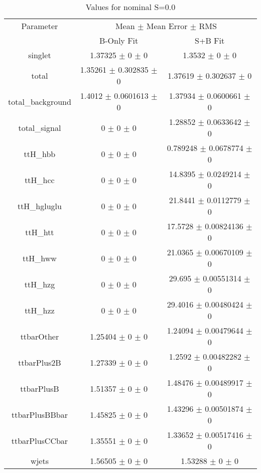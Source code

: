 \begin{table}
\centering
\caption{Values for nominal S=0.0}
\begin{tabular}{ccc}
\toprule
Parameter & \multicolumn{2}{c}{Mean $\pm$ Mean Error $\pm$ RMS}\\
 & B-Only Fit & S+B Fit\\
\midrule
singlet & \num{1.37325} $\pm$ \num{0} $\pm$ \num{0} & \num{1.3532} $\pm$ \num{0} $\pm$ \num{0}\\
total & \num{1.35261} $\pm$ \num{0.302835} $\pm$ \num{0} & \num{1.37619} $\pm$ \num{0.302637} $\pm$ \num{0}\\
total\_background & \num{1.4012} $\pm$ \num{0.0601613} $\pm$ \num{0} & \num{1.37934} $\pm$ \num{0.0600661} $\pm$ \num{0}\\
total\_signal & \num{0} $\pm$ \num{0} $\pm$ \num{0} & \num{1.28852} $\pm$ \num{0.0633642} $\pm$ \num{0}\\
ttH\_hbb & \num{0} $\pm$ \num{0} $\pm$ \num{0} & \num{0.789248} $\pm$ \num{0.0678774} $\pm$ \num{0}\\
ttH\_hcc & \num{0} $\pm$ \num{0} $\pm$ \num{0} & \num{14.8395} $\pm$ \num{0.0249214} $\pm$ \num{0}\\
ttH\_hgluglu & \num{0} $\pm$ \num{0} $\pm$ \num{0} & \num{21.8441} $\pm$ \num{0.0112779} $\pm$ \num{0}\\
ttH\_htt & \num{0} $\pm$ \num{0} $\pm$ \num{0} & \num{17.5728} $\pm$ \num{0.00824136} $\pm$ \num{0}\\
ttH\_hww & \num{0} $\pm$ \num{0} $\pm$ \num{0} & \num{21.0365} $\pm$ \num{0.00670109} $\pm$ \num{0}\\
ttH\_hzg & \num{0} $\pm$ \num{0} $\pm$ \num{0} & \num{29.695} $\pm$ \num{0.00551314} $\pm$ \num{0}\\
ttH\_hzz & \num{0} $\pm$ \num{0} $\pm$ \num{0} & \num{29.4016} $\pm$ \num{0.00480424} $\pm$ \num{0}\\
ttbarOther & \num{1.25404} $\pm$ \num{0} $\pm$ \num{0} & \num{1.24094} $\pm$ \num{0.00479644} $\pm$ \num{0}\\
ttbarPlus2B & \num{1.27339} $\pm$ \num{0} $\pm$ \num{0} & \num{1.2592} $\pm$ \num{0.00482282} $\pm$ \num{0}\\
ttbarPlusB & \num{1.51357} $\pm$ \num{0} $\pm$ \num{0} & \num{1.48476} $\pm$ \num{0.00489917} $\pm$ \num{0}\\
ttbarPlusBBbar & \num{1.45825} $\pm$ \num{0} $\pm$ \num{0} & \num{1.43296} $\pm$ \num{0.00501874} $\pm$ \num{0}\\
ttbarPlusCCbar & \num{1.35551} $\pm$ \num{0} $\pm$ \num{0} & \num{1.33652} $\pm$ \num{0.00517416} $\pm$ \num{0}\\
wjets & \num{1.56505} $\pm$ \num{0} $\pm$ \num{0} & \num{1.53288} $\pm$ \num{0} $\pm$ \num{0}\\
\bottomrule
\end{tabular}
\end{table}